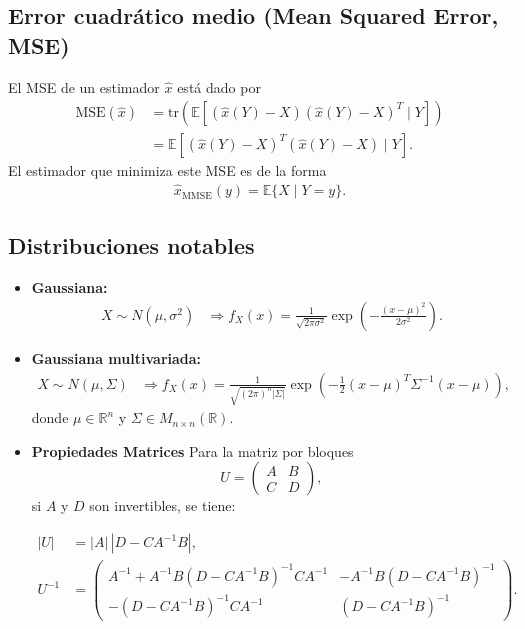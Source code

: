 \documentclass[
  11pt,
  letterpaper,
   addpoints,
  ]{exam}
\begin{document}
\subsection*{Error cuadrático medio (Mean Squared Error, MSE)}
El MSE de un estimador $\hat{x}$ está dado por
\begin{align}
\text{MSE}(\hat{x}) &= \text{tr}\left( \mathbb{E} \left[ (\hat{x}(Y) - X)(\hat{x}(Y) - X)^T \mid Y \right] \right) \\
&= \mathbb{E}\left[ (\hat{x}(Y) - X)^T (\hat{x}(Y) - X) \mid Y \right].
\end{align}
El estimador que minimiza este MSE es de la forma
\begin{align}
\hat{x}_{\text{MMSE}}(y) = \mathbb{E}\{X \mid Y = y\}.
\end{align}

\subsection*{Distribuciones notables}
\begin{itemize}
    \item \textbf{Gaussiana:} 
    \begin{align}
    X \sim N(\mu, \sigma^2) &\Rightarrow f_X(x) = \frac{1}{\sqrt{2\pi\sigma^2}} \exp\left( - \frac{(x - \mu)^2}{2\sigma^2} \right).
    \end{align}
    
    \item \textbf{Gaussiana multivariada:}
    \begin{align}
    X \sim N(\mu, \Sigma) &\Rightarrow f_X(x) = \frac{1}{\sqrt{(2\pi)^n |\Sigma|}} \exp\left( - \frac{1}{2} (x - \mu)^T \Sigma^{-1} (x - \mu) \right),
    \end{align}
    donde $\mu \in \mathbb{R}^n$ y $\Sigma \in M_{n \times n}(\mathbb{R})$.
    \item \textbf{Propiedades Matrices}
    Para la matriz por bloques
\[
U = \begin{pmatrix}
A & B \\
C & D
\end{pmatrix},
\]
si \(A\) y \(D\) son invertibles, se tiene:

\begin{align}
|U| &= |A| \, |D - CA^{-1}B|, \tag{8} \\
U^{-1} &= \begin{pmatrix}
A^{-1} + A^{-1}B(D - CA^{-1}B)^{-1}CA^{-1} & -A^{-1}B(D - CA^{-1}B)^{-1} \\
-(D - CA^{-1}B)^{-1}CA^{-1} & (D - CA^{-1}B)^{-1}
\end{pmatrix}. \tag{9}
\end{align}
\end{itemize}
\end{document}
